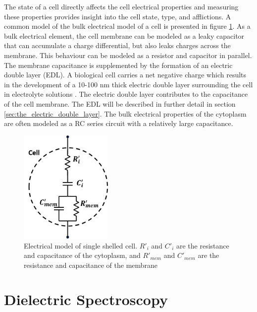 \par The state of a cell directly affects the cell electrical properties and measuring these properties provides insight into the cell state, type, and afflictions. A common model of the bulk electrical model of a cell is presented in figure \ref{fig:electric_model_cell}. As a bulk electrical element, the cell membrane can be modeled as a leaky capacitor that can accumulate a charge differential, but also leaks charges across the membrane. This behaviour can be modeled as a resistor and capacitor in parallel. The membrane capacitance is supplemented by the formation of an electric double layer (EDL). A biological cell carries a net negative charge which results in the development of a 10-100 nm thick electric double layer surrounding the cell in electrolyte solutions \cite{swaminathan_effect_2009}. The electric double layer contributes to the capacitance of the cell membrane. The EDL will be described in further detail in section \ref{sec:the_electric_double_layer}. The bulk electrical properties of the cytoplasm are often modeled as a RC series circuit with a relatively large capacitance. 

\begin{figure}
    \centering
    \includegraphics[width=0.4\textwidth]{images/completeCellCircuit.png}
    \caption[Electrical model of single shelled cell.]{Electrical model of single shelled cell. $R'_i$ and $C'_i$ are the resistance and capacitance of the cytoplasm, and $R'_{mem}$ and $C'_{mem}$ are the resistance and capacitance of the membrane}
    \label{fig:electric_model_cell}
\end{figure}
 
 \section{Dielectric Spectroscopy}

